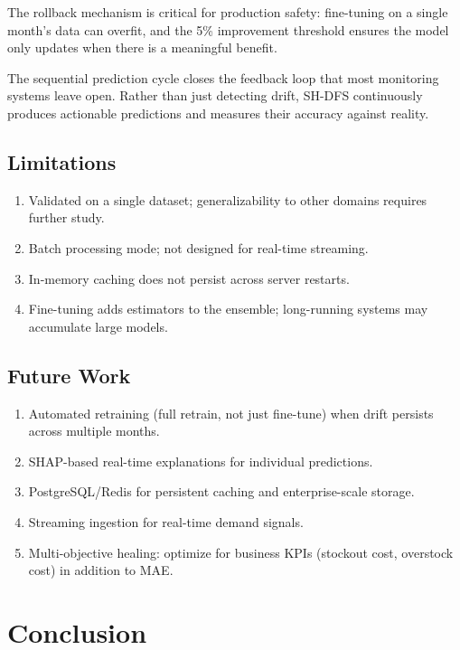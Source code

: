 \documentclass[conference]{IEEEtran}
\begin{document}
The rollback mechanism is critical for production safety: fine-tuning on a single month's data can overfit, and the 5\% improvement threshold ensures the model only updates when there is a meaningful benefit.

The sequential prediction cycle closes the feedback loop that most monitoring systems leave open. Rather than just detecting drift, SH-DFS continuously produces actionable predictions and measures their accuracy against reality.

\subsection{Limitations}

\begin{enumerate}
    \item Validated on a single dataset; generalizability to other domains requires further study.
    \item Batch processing mode; not designed for real-time streaming.
    \item In-memory caching does not persist across server restarts.
    \item Fine-tuning adds estimators to the ensemble; long-running systems may accumulate large models.
\end{enumerate}

\subsection{Future Work}

\begin{enumerate}
    \item Automated retraining (full retrain, not just fine-tune) when drift persists across multiple months.
    \item SHAP-based real-time explanations for individual predictions.
    \item PostgreSQL/Redis for persistent caching and enterprise-scale storage.
    \item Streaming ingestion for real-time demand signals.
    \item Multi-objective healing: optimize for business KPIs (stockout cost, overstock cost) in addition to MAE.
\end{enumerate}

\section{Conclusion}
\end{document}
